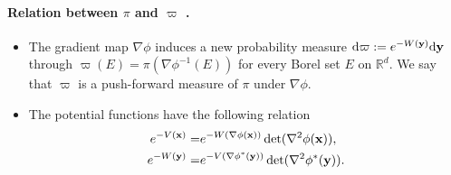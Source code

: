 \paragraph{Relation between $\pi$ and $\varpi$ \cite{hsieh2018mirrored}.}
\begin{itemize}
	\item The gradient map $\nabla\phi$ induces a new probability measure $\mathrm{d}\varpi:=e^{-W(\mathbf{y})}\mathrm{d}\mathbf{y}$ through $\varpi(E) = \pi(\nabla\phi^{-1}(E))$ for every Borel set $E$ on $\mathbb{R}^d$. We say that $\varpi$ is a push-forward measure of $\pi$ under $\nabla\phi$. 
	\item The potential functions have the following relation
	\begin{align}
		e^{-V(\mathbf{x})} = & e^{-W(\nabla\phi(\mathbf{x}))}\det(\nabla^2\phi(\mathbf{x})), \\
		e^{-W(\mathbf{y})} = & e^{-V(\nabla\phi^*(\mathbf{y}))}\det(\nabla^2\phi^*(\mathbf{y})).
	\end{align}
\end{itemize}